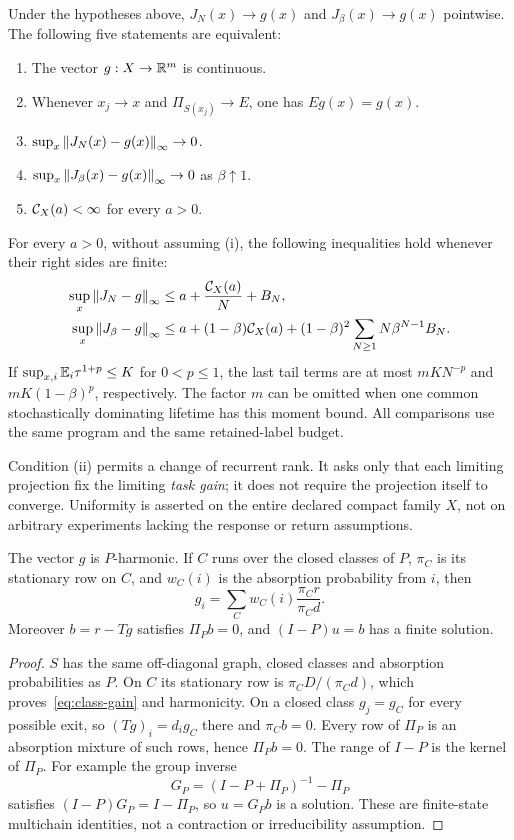 \begin{theorem}\label{thm:transfer}
Under the hypotheses above, $J_N(x)\to g(x)$ and $J_\beta(x)\to g(x)$ pointwise. The following five statements are equivalent:
\begin{enumerate}
\item[(i)] The vector $g:X\to\mathbb R^m$ is continuous.
\item[(ii)] Whenever $x_j\to x$ and $\Pi_{S(x_j)}\to E$, one has $Eg(x)=g(x)$.
\item[(iii)] $\sup_x\left\lVert J_N(x)-g(x)\right\rVert_\infty\to0$.
\item[(iv)] $\sup_x\left\lVert J_\beta(x)-g(x)\right\rVert_\infty\to0$ as $\beta\uparrow1$.
\item[(v)] $\mathcal C_X(a)<\infty$ for every $a>0$.
\end{enumerate}
For every $a>0$, without assuming (i), the following inequalities hold whenever their right sides are finite:
\begin{align}
 \sup_x\left\lVert J_N-g\right\rVert_\infty
 &\le a+\frac{\mathcal C_X(a)}{N}+B_N,\label{eq:physical-bound}\\
 \sup_x\left\lVert J_\beta-g\right\rVert_\infty
 &\le a+(1-\beta)\mathcal C_X(a)
 +(1-\beta)^2\sum_{N\ge1}N\beta^{N-1}B_N.\label{eq:discount-bound}
\end{align}
If $\sup_{x,i}\mathbb E_i\tau^{1+p}\le K$ for $0<p\le1$, the last tail terms are at most $mKN^{-p}$ and $mK(1-\beta)^p$, respectively. The factor $m$ can be omitted when one common stochastically dominating lifetime has this moment bound. All comparisons use the same program and the same retained-label budget.
\end{theorem}
Condition (ii) permits a change of recurrent rank. It asks only that each limiting projection fix the limiting \emph{task gain}; it does not require the projection itself to converge. Uniformity is asserted on the entire declared compact family $X$, not on arbitrary experiments lacking the response or return assumptions.

\begin{lemma}\label{lem:marked}
The vector $g$ is $P$-harmonic. If $C$ runs over the closed classes of $P$, $\pi_C$ is its stationary row on $C$, and $w_C(i)$ is the absorption probability from $i$, then
\begin{equation}\label{eq:class-gain}
 g_i=\sum_C w_C(i)\frac{\pi_Cr}{\pi_Cd}.
\end{equation}
Moreover $b=r-Tg$ satisfies $\Pi_Pb=0$, and $(I-P)u=b$ has a finite solution.
\end{lemma}
\begin{proof}
$S$ has the same off-diagonal graph, closed classes and absorption probabilities as $P$. On $C$ its stationary row is $\pi_C D/(\pi_Cd)$, which proves~\eqref{eq:class-gain} and harmonicity. On a closed class $g_j=g_C$ for every possible exit, so $(Tg)_i=d_i g_C$ there and $\pi_Cb=0$. Every row of $\Pi_P$ is an absorption mixture of such rows, hence $\Pi_Pb=0$. The range of $I-P$ is the kernel of $\Pi_P$. For example the group inverse
\[
 G_P=(I-P+\Pi_P)^{-1}-\Pi_P
\]
satisfies $(I-P)G_P=I-\Pi_P$, so $u=G_Pb$ is a solution. These are finite-state multichain identities, not a contraction or irreducibility assumption.
\end{proof}

